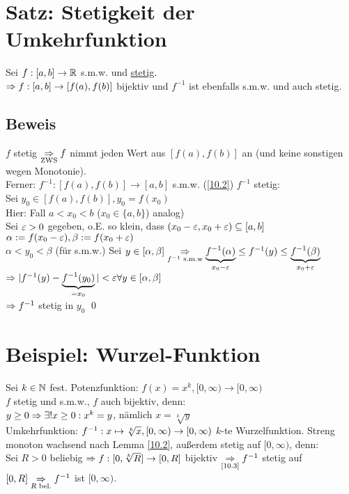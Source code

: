 \section{Satz: Stetigkeit der Umkehrfunktion}\label{10.3}
Sei $f: [a,b] \to \mathbb{R}$ s.m.w. und \underline{stetig}.\\
$\Rightarrow f: [a,b] \to [f(a),f(b)]$ bijektiv und $f^{-1}$ ist ebenfalls s.m.w. und auch stetig.

\subsection*{Beweis}
$f$ stetig $\underset{\text{ZWS}}{\Rightarrow} f$ nimmt jeden Wert aus $[f(a),f(b)]$ an (und keine sonstigen wegen Monotonie).\\
Ferner: $f^{-1}: [f(a),f(b)] \to [a,b]$ s.m.w. (\ref{10.2})\nl
$f^{-1}$ stetig:\\
Sei $y_0 \in [f(a),f(b)], y_0 = f(x_0)$\\
Hier: Fall $a < x_0 < b$ ($x_0 \in \{a,b\}$) analog)\\
Sei $\varepsilon > 0$ gegeben, o.E. so klein, dass $(x_0 - \varepsilon, x_0 + \varepsilon) \subseteq [a,b]$\\
$\alpha := f(x_0-\varepsilon), \beta := f(x_0+\varepsilon)$\\
$\alpha < y_0 < \beta$ (für s.m.w.)\nl
Sei $y \in [\alpha,\beta] \underset{f^{-1} \text{ s.m.w}}{\Rightarrow} \underbrace{f^{-1}(\alpha)}_{x_0-\varepsilon} \le f^{-1}(y) \le \underbrace{f^{-1}(\beta)}_{x_0+\varepsilon}$\\
$\Rightarrow |f^{-1}(y) - \underbrace{f^{-1}(y_0)}_{=x_0}| < \varepsilon \forall y \in [\alpha,\beta]$\\
$\Rightarrow f^{-1}$ stetig in $y_0$ \qed

\section{Beispiel: Wurzel-Funktion}\label{10.4}
Sei $k \in \mathbb{N}$ fest. Potenzfunktion: $f(x)=x^k, [0,\infty) \to [0,\infty)$\\
$f$ stetig und s.m.w., $f$ auch bijektiv, denn:\\
$y \ge 0 \Rightarrow \exists! x \ge 0: x^k = y$, nämlich $x=\sqrt[k]{y}$\\
Umkehrfunktion: $f^{-1}: x \mapsto \sqrt[k]{x}, [0,\infty) \to [0,\infty)$ $k$-te Wurzelfunktion.\nl
Streng monoton wachsend nach Lemma \ref{10.2}, außerdem stetig auf $[0,\infty)$, denn:\\
Sei $R > 0$ beliebig $\Rightarrow f: [0,\sqrt[k]{R}] \to [0,R]$ bijektiv $\underset{\text{\ref{10.3}}}{\Rightarrow} f^{-1}$ stetig auf $[0,R] \underset{R \text{ bel.}}{\Rightarrow} f^{-1}$ ist $[0,\infty)$.\nl
{}